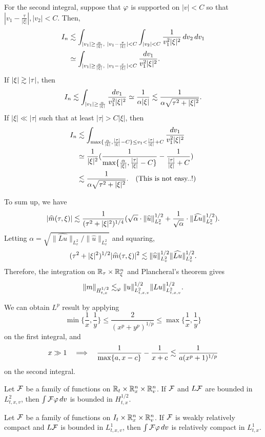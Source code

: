 \documentclass[11pt]{article}
\begin{document}
\begin{pf}
For the second integral, suppose that $\varphi$ is supported on $|v|<C$ so that $|v_1-\frac\tau{|\xi|}|,|v_2|<C$.
Then,
\begin{align*}
I_n&\les\int_{|v_1|\ge\frac\alpha{|\xi|},\ |v_1-\frac\tau{|\xi|}|<C}\int_{|v_2|<C}\frac1{v_1^2|\xi|^2}\,dv_2\,dv_1\\
&\simeq\int_{|v_1|\ge\frac\alpha{|\xi|},\ |v_1-\frac\tau{|\xi|}|<C}\frac{dv_1}{v_1^2|\xi|^2}.
\end{align*}
If $|\xi|\gtrsim|\tau|$, then
\[I_n\lesssim\int_{|v_1|\ge\frac\alpha{|\xi|}}\frac{dv_1}{v_1^2|\xi|^2}\simeq\frac1{\alpha|\xi|}\lesssim\frac1{\alpha\sqrt{\tau^2+|\xi|^2}}.\]
If $|\xi|\ll|\tau|$ such that at least $|\tau|>C|\xi|$, then
\begin{align*}
I_n&\lesssim\int_{\max\{\frac\alpha{|\xi|},\frac{|\tau|}{|\xi|}-C\}\le v_1<\frac{|\tau|}{|\xi|}+C}\frac{dv_1}{v_1^2|\xi|^2}\\
&\simeq\frac1{|\xi|^2}(\frac1{\max\{\frac\alpha{|\xi|},\frac{|\tau|}{|\xi|}-C\}}-\frac1{\frac{|\tau|}{|\xi|}+C})\\
&\lesssim\frac1{\alpha\sqrt{\tau^2+|\xi|^2}}.\quad(\text{This is not easy..!})
\end{align*}

To sum up, we have
\[|\widehat m(\tau,\xi)|\lesssim\frac1{(\tau^2+|\xi|^2)^{1/4}}(\sqrt\alpha\cdot\|\widehat u\|_{L_v^2}^{1/2}+\frac1{\sqrt\alpha}\cdot\|\widehat{Lu}\|_{L_v^2}^{1/2}).\]
Letting $\alpha=\sqrt{\|\hat{Lu}\|_{L_v^2}/\|\hat u\|_{L_v^2}}$ and squaring,
\[(\tau^2+|\xi|^2)^{1/2}|\widehat m(\tau,\xi)|^2\lesssim\|\widehat u\|_{L_v^2}^{1/2}\|\widehat{Lu}\|_{L_v^2}^{1/2}.\]
Therefore, the integration on $\mathbb{R}_\tau\times\mathbb{R}_\xi^n$ and Plancheral's theorem gives
\[\|m\|_{H_{t,x}^{1/2}}\lesssim_\varphi\|u\|_{L_{t,x,v}^2}^{1/2}\|Lu\|_{L_{t,x,v}^2}^{1/2}.\]
\end{pf}

\begin{rmk}
We can obtain $L^p$ result by applying
\[\min\{\frac1x,\frac1y\}\le\frac2{(x^p+y^p)^{1/p}}\le\max\{\frac1x,\frac1y\}\]
on the first integral, and
\[x\gg1\impl\frac1{\max\{a,x-c\}}-\frac1{x+c}\les\frac1{a(x^p+1)^{1/p}}\]
on the second integral.
\end{rmk}

\begin{cor}
Let $\mathcal{F}$ be a family of functions on $\mathbb{R}_t\times\mathbb{R}_x^n\times\mathbb{R}_v^n$.
If $\mathcal{F}$ and $L\mathcal{F}$ are bounded in $L_{t,x,v}^2$, then $\int\mathcal{F}\varphi\,dv$ is bounded in $H_{t,x}^{1/2}$.
\end{cor}

\begin{thm}
Let $\mathcal{F}$ be a family of functions on $I_t\times\mathbb{R}_x^n\times\mathbb{R}_v^n$.
If $\mathcal{F}$ is weakly relatively compact and $L\mathcal{F}$ is bounded in $L_{t,x,v}^1$, then $\int\mathcal{F}\varphi\,dv$ is relatively compact in $L_{t,x}^1$.
\end{thm}
\end{document}
